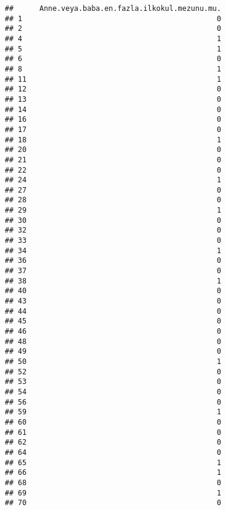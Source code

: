 \documentclass[
]{article}
\begin{document}
\begin{verbatim}
##      Anne.veya.baba.en.fazla.ilkokul.mezunu.mu.
## 1                                             0
## 2                                             0
## 4                                             1
## 5                                             1
## 6                                             0
## 8                                             1
## 11                                            1
## 12                                            0
## 13                                            0
## 14                                            0
## 16                                            0
## 17                                            0
## 18                                            1
## 20                                            0
## 21                                            0
## 22                                            0
## 24                                            1
## 27                                            0
## 28                                            0
## 29                                            1
## 30                                            0
## 32                                            0
## 33                                            0
## 34                                            1
## 36                                            0
## 37                                            0
## 38                                            1
## 40                                            0
## 43                                            0
## 44                                            0
## 45                                            0
## 46                                            0
## 48                                            0
## 49                                            0
## 50                                            1
## 52                                            0
## 53                                            0
## 54                                            0
## 56                                            0
## 59                                            1
## 60                                            0
## 61                                            0
## 62                                            0
## 64                                            0
## 65                                            1
## 66                                            1
## 68                                            0
## 69                                            1
## 70                                            0

\end{verbatim}
\end{document}
